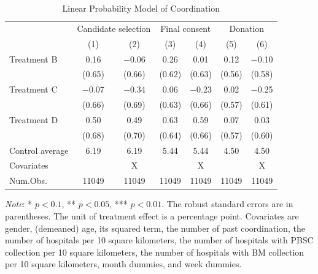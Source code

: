 \documentclass[12pt, a4paper]{article}
\begin{document}
\begin{table}[H]

\caption{\label{tab:coordinate-reg}Linear Probability Model of Coordination}
\centering
\fontsize{9}{11}\selectfont
\begin{threeparttable}
\begin{tabular}[t]{lcccccc}
\toprule
\multicolumn{1}{c}{ } & \multicolumn{2}{c}{Candidate selection} & \multicolumn{2}{c}{Final consent} & \multicolumn{2}{c}{Donation} \\
\cmidrule(l{3pt}r{3pt}){2-3} \cmidrule(l{3pt}r{3pt}){4-5} \cmidrule(l{3pt}r{3pt}){6-7}
  & (1) & (2) & (3) & (4) & (5) & (6)\\
\midrule
Treatment B & \num{0.16} & \num{-0.06} & \num{0.26} & \num{0.01} & \num{0.12} & \num{-0.10}\\
 & (\num{0.65}) & (\num{0.66}) & (\num{0.62}) & (\num{0.63}) & (\num{0.56}) & (\num{0.58})\\
Treatment C & \num{-0.07} & \num{-0.34} & \num{0.06} & \num{-0.23} & \num{0.02} & \num{-0.25}\\
 & (\num{0.66}) & (\num{0.69}) & (\num{0.63}) & (\num{0.66}) & (\num{0.57}) & (\num{0.61})\\
Treatment D & \num{0.50} & \num{0.49} & \num{0.63} & \num{0.59} & \num{0.07} & \num{0.03}\\
 & (\num{0.68}) & (\num{0.70}) & (\num{0.64}) & (\num{0.66}) & (\num{0.57}) & (\num{0.60})\\
\midrule
Control average & 6.19 & 6.19 & 5.44 & 5.44 & 4.50 & 4.50\\
Covariates &  & X &  & X &  & X\\
Num.Obs. & \num{11049} & \num{11049} & \num{11049} & \num{11049} & \num{11049} & \num{11049}\\
\bottomrule
\end{tabular}
\begin{tablenotes}
\item \emph{Note}: * $p < 0.1$, ** $p < 0.05$, *** $p < 0.01$. The robust standard errors are in parentheses. The unit of treatment effect is a percentage point. Covariates are gender, (demeaned) age, its squared term, the number of past coordination, the number of hospitals per 10 square kilometers, the number of hospitals with PBSC collection per 10 square kilometers, the number of hospitals with BM collection per 10 square kilometers, month dummies, and week dummies.
\end{tablenotes}
\end{threeparttable}
\end{table}
\end{document}

